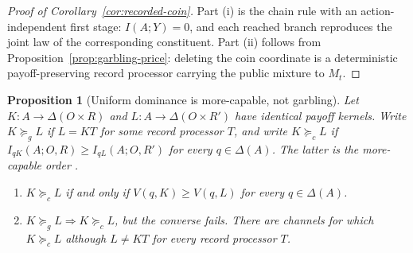 \documentclass[11pt,a4paper]{article}
\newtheorem{proposition}[theorem]{Proposition}
\theoremstyle{definition}
\newcommand{\D}{\Delta}
\newcommand{\I}{I}
\newcommand{\1}{\mathbf 1}
\begin{document}
\begin{proof}[Proof of Corollary~\ref{cor:recorded-coin}]
Part \textup{(i)} is the chain rule with an action-independent first stage:
$\I(A;Y)=0$, and each reached branch reproduces the joint law of the
corresponding constituent.  Part \textup{(ii)} follows from
Proposition~\ref{prop:garbling-price}: deleting the coin coordinate is a
deterministic payoff-preserving record processor carrying the public mixture
to $M_t$.
\end{proof}

\begin{proposition}[Uniform dominance is more-capable, not garbling]
\label{prop:blackwell}\label{def:channel-orders}
Let $K:A\to\D(O\times R)$ and $L:A\to\D(O\times R')$ have identical
payoff kernels.  Write $K\succeq_gL$ if $L=KT$ for some record processor
$T$, and write $K\succeq_cL$ if
$\I_{qK}(A;O,R)\ge\I_{qL}(A;O,R')$ for every $q\in\D(A)$.  The latter is
the \emph{more-capable} order \cite{KornerMarton1977}.
\begin{enumerate}[label=\textup{(\roman*)},leftmargin=*]
\item $K\succeq_cL$ if and only if $V(q,K)\ge V(q,L)$ for every $q\in\D(A)$.
\item $K\succeq_gL\Rightarrow K\succeq_cL$, but the converse fails.  There are channels for which
$K\succeq_cL$ although $L\ne KT$ for every record processor $T$.
\end{enumerate}
\end{proposition}
\end{document}
